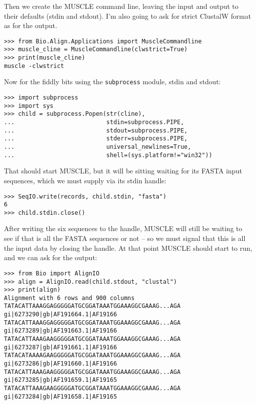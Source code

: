 Then we create the MUSCLE command line, leaving the input and output to their
defaults (stdin and stdout). I'm also going to ask for strict ClustalW format
as for the output.

\begin{verbatim}
>>> from Bio.Align.Applications import MuscleCommandline
>>> muscle_cline = MuscleCommandline(clwstrict=True)
>>> print(muscle_cline)
muscle -clwstrict
\end{verbatim}

Now for the fiddly bits using the \verb|subprocess| module, stdin and stdout:

\begin{verbatim}
>>> import subprocess
>>> import sys
>>> child = subprocess.Popen(str(cline),
...                          stdin=subprocess.PIPE,
...                          stdout=subprocess.PIPE,
...                          stderr=subprocess.PIPE,
...                          universal_newlines=True,
...                          shell=(sys.platform!="win32"))
\end{verbatim}

That should start MUSCLE, but it will be sitting waiting for its FASTA input
sequences, which we must supply via its stdin handle:

\begin{verbatim}
>>> SeqIO.write(records, child.stdin, "fasta")
6
>>> child.stdin.close()
\end{verbatim}

After writing the six sequences to the handle, MUSCLE will still be waiting
to see if that is all the FASTA sequences or not -- so we must signal that
this is all the input data by closing the handle. At that point MUSCLE should
start to run, and we can ask for the output:

\begin{verbatim}
>>> from Bio import AlignIO
>>> align = AlignIO.read(child.stdout, "clustal")
>>> print(align)
Alignment with 6 rows and 900 columns
TATACATTAAAGGAGGGGGATGCGGATAAATGGAAAGGCGAAAG...AGA gi|6273290|gb|AF191664.1|AF19166
TATACATTAAAGGAGGGGGATGCGGATAAATGGAAAGGCGAAAG...AGA gi|6273289|gb|AF191663.1|AF19166
TATACATTAAAGAAGGGGGATGCGGATAAATGGAAAGGCGAAAG...AGA gi|6273287|gb|AF191661.1|AF19166
TATACATAAAAGAAGGGGGATGCGGATAAATGGAAAGGCGAAAG...AGA gi|6273286|gb|AF191660.1|AF19166
TATACATTAAAGAAGGGGGATGCGGATAAATGGAAAGGCGAAAG...AGA gi|6273285|gb|AF191659.1|AF19165
TATACATTAAAGAAGGGGGATGCGGATAAATGGAAAGGCGAAAG...AGA gi|6273284|gb|AF191658.1|AF19165
\end{verbatim}

